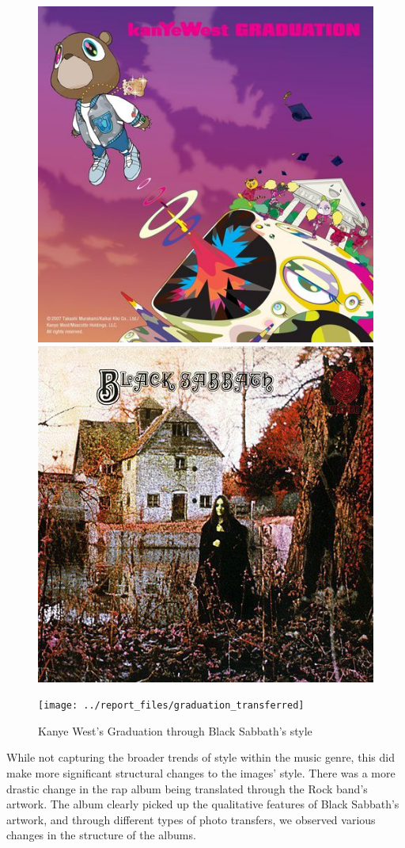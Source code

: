 \documentclass{article}
\begin{document}
\begin{figure}[h!]
\centering
\begin{minipage}{.3\textwidth}
  \centering
  \includegraphics[width=.7\linewidth]{../report_files/graduation}
\end{minipage}%
\begin{minipage}{.3\textwidth}
  \centering
  \includegraphics[width=.7\linewidth]{../report_files/Black-Sabbath}
\end{minipage}
\begin{minipage}{.3\textwidth}
  \centering
  \texttt{[image: ../report\_files/graduation\_transferred]}
\end{minipage}
\caption{Kanye West's Graduation through Black Sabbath's style}
\end{figure}

While not capturing the broader trends of style within the music genre, this did make more significant structural changes to the images' style. There was a more drastic change in the rap album being translated through the Rock band's artwork. The album clearly picked up the qualitative features of Black Sabbath's artwork, and through different types of photo transfers, we observed various changes in the structure of the albums.
\end{document}
